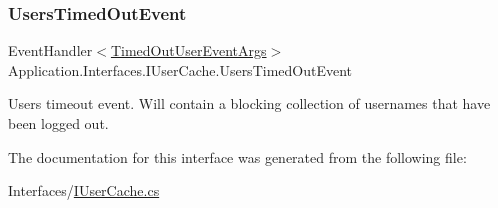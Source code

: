 \subsubsection{\texorpdfstring{Users\+Timed\+Out\+Event}{UsersTimedOutEvent}}
{\footnotesize\ttfamily Event\+Handler$<$\mbox{\hyperlink{class_application_1_1_interfaces_1_1_timed_out_user_event_args}{Timed\+Out\+User\+Event\+Args}}$>$ Application.\+Interfaces.\+I\+User\+Cache.\+Users\+Timed\+Out\+Event}



Users timeout event. Will contain a blocking collection of usernames that have been logged out. 



The documentation for this interface was generated from the following file\+:\begin{DoxyCompactItemize}
\item 
Interfaces/\mbox{\hyperlink{_i_user_cache_8cs}{I\+User\+Cache.\+cs}}\end{DoxyCompactItemize}
